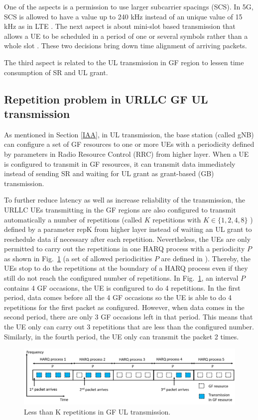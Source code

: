 \documentclass[conference]{IEEEtran}
\begin{document}
One of the aspects is a permission to use larger subcarrier spacings (SCS). In 5G, SCS is allowed to have a value up to 240 kHz instead of an unique value of 15 kHz as in LTE \cite{ad2}. The next aspect is about mini-slot based transmission that allows a UE to be scheduled in a period of one or several symbols rather than a whole slot \cite{ad3}. These two decisions bring down time alignment of arriving packets.

The third aspect is related to the UL transmission in GF region to lessen time consumption of SR and UL grant\cite{ad4}.

\subsection{Repetition problem in URLLC GF UL transmission}\label{IBB}
As mentioned in Section \ref{IAA}, in UL transmission, the base station (called gNB) can configure a set of GF resources to one or more UEs with a periodicity defined by parameters in Radio Resource Control (RRC) from higher layer. When a UE is configured to transmit in GF resources, it can transmit data immediately instead of sending SR and waiting for UL grant as grant-based (GB) transmission.

To further reduce latency as well as increase reliability of the transmission, the URLLC UEs transmitting in the GF regions are also configured to transmit automatically a number of repetitions (called $K$ repetitions with $K \in \{1, 2, 4, 8\}$ \cite{ad5}) defined by a parameter repK from higher layer instead of waiting an UL grant to reschedule data if necessary after each repetition. Nevertheless, the UEs are only permitted to carry out the repetitions in one HARQ process with a periodicity $P$ as shown in Fig.~\ref{fig1} (a set of allowed periodicities $P$ are defined in \cite{ad5}). Thereby, the UEs stop to do the repetitions at the boundary of a HARQ process even if they still do not reach the configured number of repetitions. In Fig.~\ref{fig1}, an interval $P$ contains 4 GF occasions, the UE is configured to do 4 repetitions. In the first period, data comes before all the 4 GF occasions so the UE is able to do 4 repetitions for the first packet as configured. However, when data comes in the second period, there are only 3 GF occasions left in that period. This means that the UE only can carry out 3 repetitions that are less than the configured number. Similarly, in the fourth period, the UE only can transmit the packet 2 times. 
\begin{figure}[htbp]
\centerline{\includegraphics[scale=0.25]{fig1.png}}
\caption{Less than K repetitions in GF UL transmission.}
\label{fig1}
\vspace{-2mm}
\end{figure}
\end{document}
